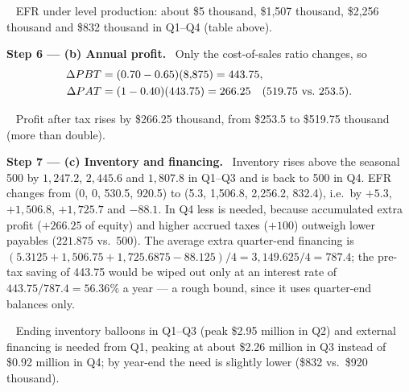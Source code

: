 \documentclass[11pt,a4paper]{article}
\newcommand{\step}[2]{\par\medskip\noindent\textbf{Step #1 --- #2.}~}
\newcommand{\answer}[1]{\par\smallskip\noindent\fbox{\textbf{Answer #1.}}~}
\begin{document}
\answer{(a)} EFR under level production: about \$5 thousand, \$1{,}507 thousand, \$2{,}256 thousand
and \$832 thousand in Q1--Q4 (table above).

\step{6}{(b) Annual profit}
Only the cost-of-sales ratio changes, so
\begin{align}
  \Delta PBT &= (0.70 - 0.65)(8{,}875) = 443.75, \notag\\
  \Delta PAT &= (1 - 0.40)(443.75) = 266.25 \quad (519.75 \text{ vs.\ } 253.5). \notag
\end{align}

\answer{(b)} Profit after tax rises by \$266.25 thousand, from \$253.5 to \$519.75 thousand (more
than double).

\step{7}{(c) Inventory and financing}
Inventory rises above the seasonal 500 by $1{,}247.2$, $2{,}445.6$ and $1{,}807.8$ in Q1--Q3 and is
back to 500 in Q4. EFR changes from (0, 0, 530.5, 920.5) to (5.3, 1{,}506.8, 2{,}256.2, 832.4),
i.e.\ by $+5.3$, $+1{,}506.8$, $+1{,}725.7$ and $-88.1$. In Q4 less is needed, because accumulated
extra profit ($+266.25$ of equity) and higher accrued taxes ($+100$) outweigh lower payables
($221.875$ vs.\ 500). The average extra quarter-end financing is $(5.3125 + 1{,}506.75 +
1{,}725.6875 - 88.125)/4 = 3{,}149.625/4 = 787.4$; the pre-tax saving of 443.75 would be wiped out
only at an interest rate of $443.75/787.4 = 56.36\%$ a year --- a rough bound, since it uses
quarter-end balances only.

\answer{(c)} Ending inventory balloons in Q1--Q3 (peak \$2.95 million in Q2) and external
financing is needed from Q1, peaking at about \$2.26 million in Q3 instead of \$0.92 million in Q4;
by year-end the need is slightly lower (\$832 vs.\ \$920 thousand).
\end{document}
